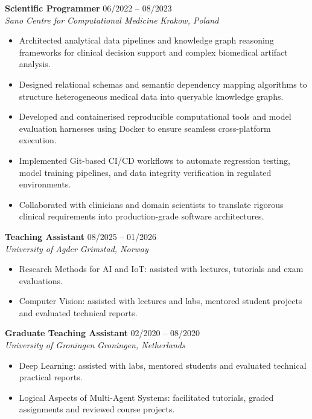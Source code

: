 \documentclass[10pt,a4paper]{article}
\begin{document}
\vspace{3pt}
\textbf{Scientific Programmer} \hfill 06/2022 -- 08/2023 \\
\textit{Sano Centre for Computational Medicine} \hfill \textit{Krakow, Poland}
\begin{itemize}[leftmargin=0.15in, label=$\bullet$]
    \item Architected analytical data pipelines and knowledge graph reasoning frameworks for clinical decision support and complex biomedical artifact analysis.
    \item Designed relational schemas and semantic dependency mapping algorithms to structure heterogeneous medical data into queryable knowledge graphs.
    \item Developed and containerised reproducible computational tools and model evaluation harnesses using Docker to ensure seamless cross-platform execution.
    \item Implemented Git-based CI/CD workflows to automate regression testing, model training pipelines, and data integrity verification in regulated environments.
    \item Collaborated with clinicians and domain scientists to translate rigorous clinical requirements into production-grade software architectures.
\end{itemize}

\vspace{3pt}
\textbf{Teaching Assistant} \hfill 08/2025 -- 01/2026 \\
\textit{University of Agder} \hfill \textit{Grimstad, Norway}
\begin{itemize}[leftmargin=0.15in, label=$\bullet$]
    \item Research Methods for AI and IoT: assisted with lectures, tutorials and exam evaluations.
    \item Computer Vision: assisted with lectures and labs, mentored student projects and evaluated technical reports.
\end{itemize}

\vspace{3pt}
\textbf{Graduate Teaching Assistant} \hfill 02/2020 -- 08/2020 \\
\textit{University of Groningen} \hfill \textit{Groningen, Netherlands}
\begin{itemize}[leftmargin=0.15in, label=$\bullet$]
    \item Deep Learning: assisted with labs, mentored students and evaluated technical practical reports.
    \item Logical Aspects of Multi-Agent Systems: facilitated tutorials, graded assignments and reviewed course projects.
\end{itemize}
\end{document}
